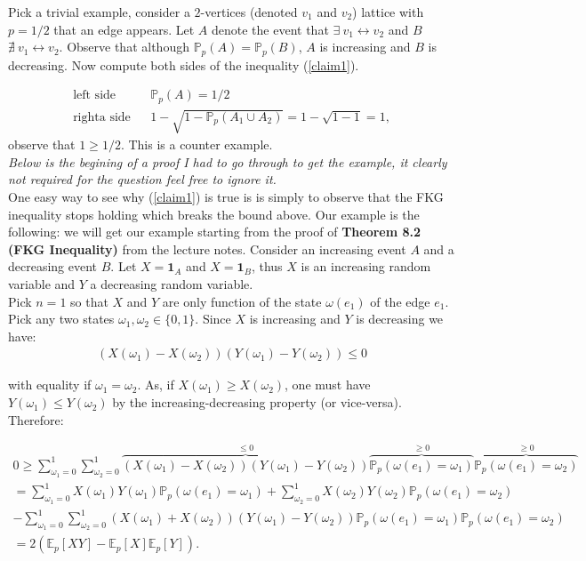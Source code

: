 \documentclass[11pt]{article}
\begin{document}
Pick a trivial example, consider a $2$-vertices (denoted $v_1$ and $v_2$) lattice with $p=1/2$ that an edge appears. Let $A$ denote the event that $\exists~ v_1 \longleftrightarrow v_2$ and $B$ $\nexists~ v_1 \longleftrightarrow v_2$. Observe that although $\mathbb{P}_p(A) = \mathbb{P}_p(B)$, $A$ is increasing and $B$ is decreasing. Now compute both sides of the inequality (\ref{claim1}).

\begin{align*}
    \text{left side} && \mathbb{P}_p(A) = 1/2 \\
    \text{righta side} && 1 - \sqrt{1 - \mathbb{P}_p(A_1 \cup A_2)}  =  1 - \sqrt{1 - 1} = 1,
\end{align*}
observe that $1\geq 1/2$. This is a counter example.\\

\textit{Below is the begining of a proof I had to go through to get the example, it clearly not required for the question feel free to ignore it.} \\

One easy way to see why (\ref{claim1}) is true is is simply to observe that the FKG inequality stops holding which breaks the bound above. Our example is the following: we will get our example starting from the proof of \textbf{Theorem 8.2 (FKG Inequality)} from the lecture notes. Consider an increasing event $A$ and a decreasing event $B$. Let $X = \bm{1}_A$ and $X = \bm{1}_B$, thus $X$ is an increasing random variable and $Y$ a decreasing random variable. \\ %

Pick $n=1$ so that $X$ and $Y$ are only function of the state $\omega(e_1)$ of the edge $e_1$. Pick any two states $\omega_1, \omega_2 \in \{0,1\}$. Since $X$ is increasing and $Y$ is decreasing we have: 
\begin{align*}
    (X(\omega_1)-X(\omega_2))(Y(\omega_1)-Y(\omega_2)) \leq 0
\end{align*}

with equality if $\omega_1 = \omega_2$. As, if $X(\omega_1)\geq X(\omega_2)$, one must have $Y(\omega_1)\leq Y(\omega_2)$ by the increasing-decreasing property (or vice-versa). Therefore: 

\begin{align*}
    0 \geq \sum_{\omega_1=0}^1 \sum_{\omega_2=0}^1 \overbrace{(X(\omega_1)-X(\omega_2))(Y(\omega_1)-Y(\omega_2))}^{\leq 0}  \overbrace{\mathbb{P}_p(\omega(e_1) = \omega_1)}^{\geq 0} \overbrace{\mathbb{P}_p(\omega(e_1) = \omega_2)}^{\geq 0}\\
    = \sum_{\omega_1=0}^1 X(\omega_1)Y(\omega_1) \mathbb{P}_p(\omega(e_1) = \omega_1) +  \sum_{\omega_2=0}^1 X(\omega_2)Y(\omega_2) \mathbb{P}_p(\omega(e_1) = \omega_2) \\
    -  \sum_{\omega_1=0}^1 \sum_{\omega_2=0}^1 (X(\omega_1)+X(\omega_2))(Y(\omega_1)-Y(\omega_2))  \mathbb{P}_p(\omega(e_1) = \omega_1) \mathbb{P}_p(\omega(e_1) = \omega_2)\\
    = 2(\mathbb{E}_p[XY]-\mathbb{E}_p[X]\mathbb{E}_p[Y]).
\end{align*}
\end{document}
